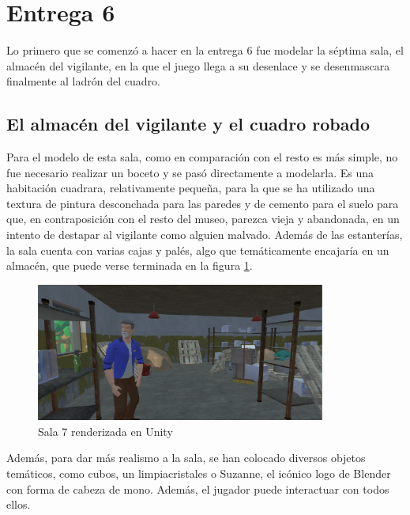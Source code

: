 \section{Entrega 6}

Lo primero que se comenzó a hacer en la entrega 6 fue modelar la séptima sala, el almacén del vigilante, en la que el juego llega a su desenlace y se desenmascara finalmente al ladrón del cuadro.

\subsection{El almacén del vigilante y el cuadro robado}

Para el modelo de esta sala, como en comparación con el resto es más simple, no fue necesario realizar un boceto y se pasó directamente a modelarla. Es una habitación cuadrara, relativamente pequeña, para la que se ha utilizado una textura de pintura desconchada para las paredes y de cemento para el suelo para que, en contraposición con el resto del museo, parezca vieja y abandonada, en un intento de destapar al vigilante como alguien malvado. Además de las estanterías, la sala cuenta con varias cajas y palés, algo que temáticamente encajaría en un almacén, que puede verse terminada en la figura \ref{fig:unity-sala-7}.

\begin{figure}[!h]
\begin{center}
\includegraphics[width=0.85\textwidth]{imagenes/7/salas-unity/unity-sala-7.png}
\caption{Sala 7 renderizada en Unity}
\label{fig:unity-sala-7}
\end{center}
\vspace{-0.35cm}
\end{figure}

Además, para dar más realismo a la sala, se han colocado diversos objetos temáticos, como cubos, un limpiacristales o Suzanne, el icónico logo de Blender con forma de cabeza de mono. Además, el jugador puede interactuar con todos ellos.

